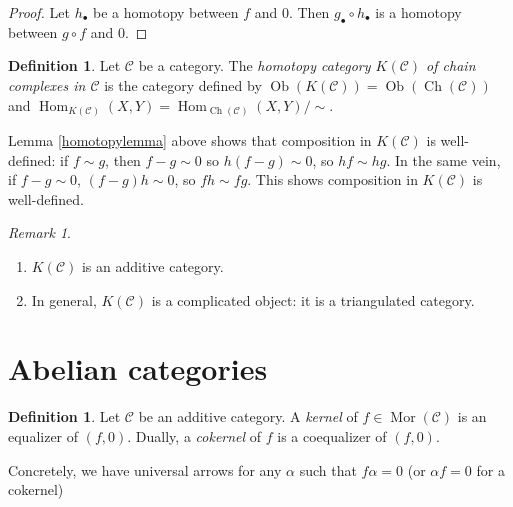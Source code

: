 \documentclass{article}
\newcommand{\cat}{\mathcal{C}}
\DeclareMathOperator{\Ch}{Ch}
\DeclareMathOperator{\Ob}{Ob}
\DeclareMathOperator{\Mor}{Mor}
\DeclareMathOperator{\Hom}{Hom}
\DeclareMathOperator{\coker}{coker}
\newcommand{\warning}{\faExclamationTriangle \hspace{3pt}}
\theoremstyle{plain}
\theoremstyle{definition}
\newtheorem{definition}[theorem]{Definition}
\theoremstyle{remark}
\newtheorem*{remark}{Remark}
\begin{document}
\begin{proof}
    Let $h_\bullet$ be a homotopy between $f$ and $0$. Then $g_\bullet \circ h_\bullet$ is a homotopy between $g\circ f$ and $0$.
\end{proof}

\begin{definition}
    Let $\cat$ be a category. The \emph{homotopy category $K(\cat)$ of chain complexes in $\cat$} is the category defined by $\Ob(K(\cat)) = \Ob(\Ch(\cat))$ and $\Hom_{K(\cat)} (X,Y) = \Hom_{\Ch(\cat)}(X,Y)/\sim$.
\end{definition}

Lemma \ref{homotopylemma} above shows that composition in $K(\cat)$ is well-defined: if $f \sim g$, then $f-g \sim 0$ so $h(f-g) \sim 0$, so $hf \sim hg$. In the same vein, if $f - g \sim 0$, $(f-g)h \sim 0$, so $fh \sim fg$. This shows composition in $K(\cat)$ is well-defined.

\begin{remark}\leavevmode
    \begin{enumerate}
        \item $K(\cat)$ is an additive category.
        \item \warning In general, $K(\cat)$ is a complicated object: it is a triangulated category.
    \end{enumerate}
\end{remark}

\section{Abelian categories}

\begin{definition}
    Let $\cat$ be an additive category. A \emph{kernel} of $f \in \Mor(\cat)$ is an equalizer of $(f,0)$. Dually, a \emph{cokernel} of $f$ is a coequalizer of $(f,0)$.
\end{definition}

Concretely, we have universal arrows for any $\alpha$ such that $f\alpha = 0$ (or $\alpha f = 0$ for a cokernel)

\begin{center}
\end{center}
\end{document}
